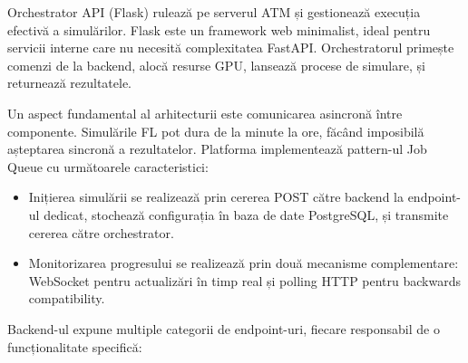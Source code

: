 \documentclass[../../main.tex]{subfiles}
\begin{document}
    Orchestrator API (Flask) rulează pe serverul ATM și gestionează execuția efectivă a simulărilor. Flask este un framework web minimalist, ideal pentru servicii interne care nu necesită complexitatea FastAPI. Orchestratorul primește comenzi de la backend, alocă resurse GPU, lansează procese de simulare, și returnează rezultatele.

    Un aspect fundamental al arhitecturii este comunicarea asincronă între componente. Simulările FL pot dura de la minute la ore, făcând imposibilă așteptarea sincronă a rezultatelor. Platforma implementează pattern-ul Job Queue cu următoarele caracteristici:

    \begin{itemize}
        \item Inițierea simulării se realizează prin cererea POST către backend la endpoint-ul dedicat, stochează configurația în baza de date PostgreSQL, și transmite cererea către orchestrator.
        \item Monitorizarea progresului se realizează prin două mecanisme complementare: WebSocket pentru actualizări în timp real și polling HTTP pentru backwards compatibility.
    \end{itemize}

    Backend-ul expune multiple categorii de endpoint-uri, fiecare responsabil de o funcționalitate specifică:
\end{document}
